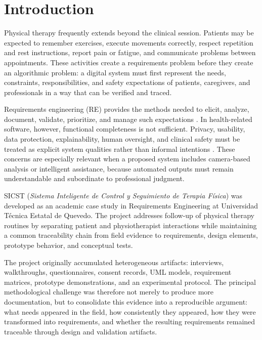 \documentclass[pdflatex,sn-basic]{sn-jnl}
\begin{document}
\section{Introduction}
Physical therapy frequently extends beyond the clinical session. Patients may be expected to remember exercises, execute movements correctly, respect repetition and rest instructions, report pain or fatigue, and communicate problems between appointments. These activities create a requirements problem before they create an algorithmic problem: a digital system must first represent the needs, constraints, responsibilities, and safety expectations of patients, caregivers, and professionals in a way that can be verified and traced.

Requirements engineering (RE) provides the methods needed to elicit, analyze, document, validate, prioritize, and manage such expectations \citep{pohl2010requirements,iso29148_2018,sommerville2016software}. In health-related software, however, functional completeness is not sufficient. Privacy, usability, data protection, explainability, human oversight, and clinical safety must be treated as explicit system qualities rather than informal intentions \citep{iso25010_2023,chung2009nfr,chazette2020explainability}. These concerns are especially relevant when a proposed system includes camera-based analysis or intelligent assistance, because automated outputs must remain understandable and subordinate to professional judgment.

SICST (\textit{Sistema Inteligente de Control y Seguimiento de Terapia Física}) was developed as an academic case study in Requirements Engineering at Universidad Técnica Estatal de Quevedo. The project addresses follow-up of physical therapy routines by separating patient and physiotherapist interactions while maintaining a common traceability chain from field evidence to requirements, design elements, prototype behavior, and conceptual tests.

The project originally accumulated heterogeneous artifacts: interviews, walkthroughs, questionnaires, consent records, UML models, requirement matrices, prototype demonstrations, and an experimental protocol. The principal methodological challenge was therefore not merely to produce more documentation, but to consolidate this evidence into a reproducible argument: what needs appeared in the field, how consistently they appeared, how they were transformed into requirements, and whether the resulting requirements remained traceable through design and validation artifacts.
\end{document}
